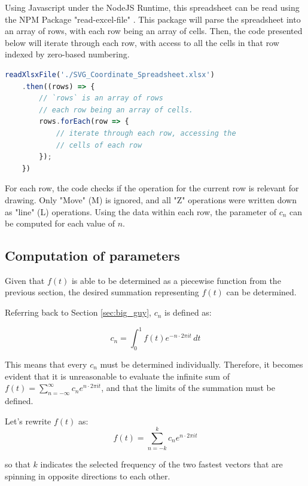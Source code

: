 \documentclass[letterpaper, 12pt]{article}
\begin{document}
Using Javascript under the NodeJS Runtime, this spreadsheet can
be read using the NPM Package "read-excel-file" \cite{kuchumovReadexcelfile}.
This package will parse the spreadsheet into an array of rows,
with each row being an array of cells. Then, the code presented
below will iterate through each row, with access to all the cells
in that row indexed by zero-based numbering.

\begin{lstlisting}[language=JavaScript]
    readXlsxFile('./SVG_Coordinate_Spreadsheet.xlsx')
    .then((rows) => {
        // `rows` is an array of rows
        // each row being an array of cells.
        rows.forEach(row => {
            // iterate through each row, accessing the
            // cells of each row
        });
    })
\end{lstlisting}

For each row, the code checks if the operation for the current
row is relevant for drawing. Only "Move" (M) is ignored, and
all "Z" operations were written down as "line" (L) operations.
Using the data within each row, the parameter of \(c_n\) can be
computed for each value of \(n\).

\subsection{Computation of parameters}

Given that \(f(t)\) is able to be determined as a piecewise function
from the previous section, the desired summation representing
\(f(t)\) can be determined.

Referring back to Section \ref*{sec:big_guy}, \(c_n\) is defined as:

\begin{equation*}
    c_n = \int_{0}^{1} f(t) e^{-n \cdot 2\pi it} \,dt
\end{equation*}

This means that every \(c_n\) must be determined individually. Therefore,
it becomes evident that it is unreasonable to evaluate the infinite sum of
\(f(t) = \sum_{n=-\infty}^{\infty} c_n e^{n \cdot 2\pi it}\), and that
the limits of the summation must be defined.

Let's rewrite \(f(t)\) as:
\begin{equation*}
    f(t) = \sum_{n=-k}^{k} c_n e^{n \cdot 2\pi it}
\end{equation*}

so that \(k\) indicates the selected frequency of the two fastest vectors
that are spinning in opposite directions to each other.
\end{document}
